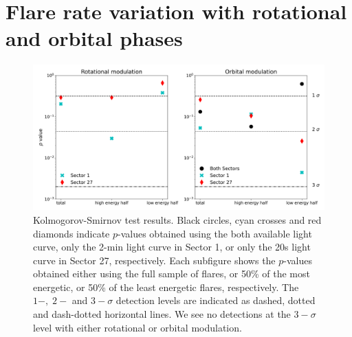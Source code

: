 \documentclass[fleqn,usenatbib,letters]{mnras}%
\begin{document}
\section{Flare rate variation with rotational and orbital phases}
\label{sec:phases}
\begin{figure}
\includegraphics[width=\hsize]{figures/2021_06_09_AUMic_KStests_meta.png} 
\caption{Kolmogorov-Smirnov test results. Black circles, cyan crosses and red diamonds indicate $p$-values obtained using the both available light curve, only the 2-min light curve in Sector 1, or only the 20s light curve in Sector 27, respectively. Each subfigure shows the $p$-values obtained either using the full sample of flares, or 50\% of the most energetic, or 50\% of the least energetic flares, respectively. The $1-,\;2-$ and $3-\sigma$ detection levels are indicated as dashed, dotted and dash-dotted horizontal lines. We see no detections at the $3-\sigma$ level with either rotational or orbital modulation.}
\label{fig:kstests}
\end{figure}
\end{document}
